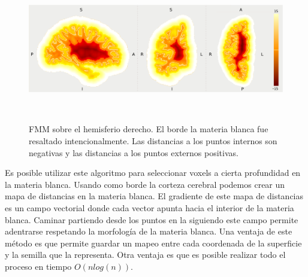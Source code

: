 \begin{figure}[h!]

\centering
\begin{minipage}[b]{0.7\textwidth}
    \includegraphics[width=\textwidth]{img/fmm.png}
    \caption{\small FMM sobre el hemisferio derecho. El borde la materia
                    blanca fue resaltado intencionalmente. Las distancias
                    a los puntos internos son negativas y las distancias a
                    los puntos externos positivas.}
    \label{fig:fmm}
\end{minipage} ~

\end{figure}  

Es posible utilizar este algoritmo para seleccionar voxels a cierta
profundidad en la materia blanca. Usando como borde la corteza cerebral
podemos crear un mapa de distancias en la materia blanca. El gradiente de
este mapa de distancias es un campo vectorial donde cada vector apunta
hacia el interior de la materia blanca. Caminar partiendo desde los puntos
en la siguiendo este campo permite adentrarse respetando la morfolog\'ia de
la materia blanca. Una ventaja de este m\'etodo es que permite guardar un
mapeo entre cada coordenada de la superficie y la semilla que la
representa. Otra ventaja es que es posible realizar todo el proceso en 
tiempo $O(n log(n))$. \\
